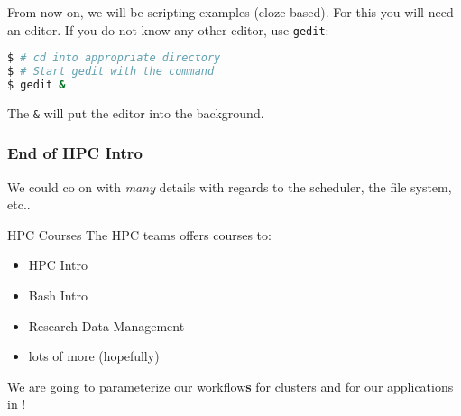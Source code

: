 \setcounter{preframe_handson}{\value{handson}}
\begin{frame}[fragile]
  \setcounter{handson}{\value{preframe_handson}}
  \frametitle{}
  \begin{hint}
  	    From now on, we will be scripting examples (cloze-based). For this you will
        need an editor. If you do not know any other editor, use \texttt{gedit}:
  \end{hint}
  \begin{lstlisting}[language=Bash, style=Shell, basicstyle=\scriptsize]
$ # cd into appropriate directory
$ # Start gedit with the command 
$ gedit &
  \end{lstlisting}
  \begin{hint}
  	The \texttt{\&} will put the editor into the background.
  \end{hint} 
\end{frame}



\begin{frame}
  \frametitle{End of HPC Intro}
  We could co on with \emph{many} details with regards to the scheduler, the file system, etc..
  \begin{block}{HPC Courses}
   The HPC teams offers courses to:
   \begin{itemize}
    \item HPC Intro
    \item Bash Intro
    \item Research Data Management
    \item lots of more (hopefully)
   \end{itemize}
  \end{block}
  \pause
  \begin{hint}
      We are going to parameterize our workflow\textbf{s} for clusters and for our applications in \Snakemake!
  \end{hint}
\end{frame}





